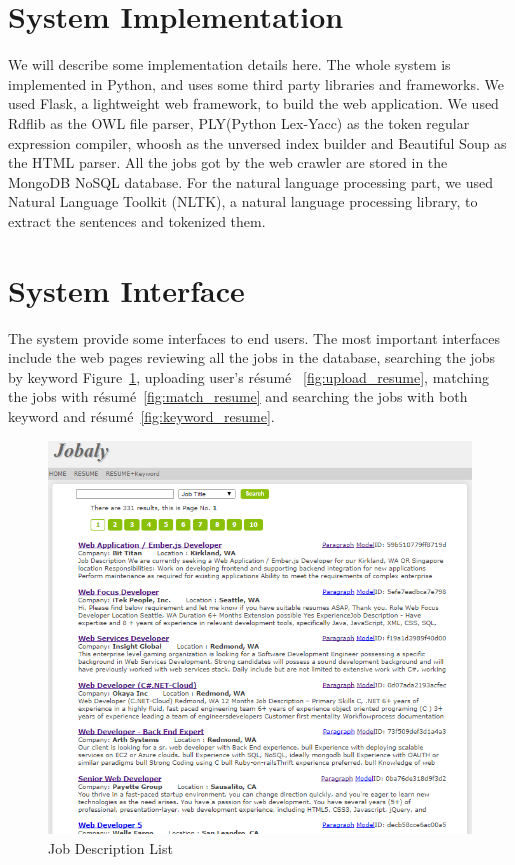 \section{System Implementation}

We will describe some implementation details here. The whole system is implemented in Python, and uses some third party libraries and frameworks. We used Flask, a lightweight web framework, to build the web application. We used Rdflib as the OWL file parser, PLY(Python Lex-Yacc) as the token regular expression compiler, whoosh as the unversed index builder and Beautiful Soup as the HTML parser.  All the jobs got by the web crawler are stored in the MongoDB NoSQL database.  For the natural language processing part, we used Natural Language Toolkit (NLTK), a  natural language processing library, to extract the sentences and tokenized them.

\section{System Interface}

The system provide some interfaces to end users. The most important interfaces include the web pages reviewing all the jobs in the database, searching the jobs by keyword Figure~\ref{fig:joblist},  uploading user's r\'esum\'e ~\ref{fig:upload_resume},  matching the jobs with r\'esum\'e~\ref{fig:match_resume} and searching the jobs with both keyword and r\'esum\'e~\ref{fig:keyword_resume}.

\begin{figure}[htbp]
  \centering
  \includegraphics[scale=0.5]{images/joblist.png}
  \caption{Job Description List}
  \label{fig:joblist}
\end{figure}


